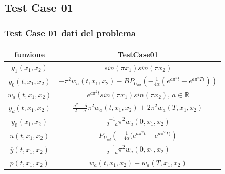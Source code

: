 \documentclass{beamer}
\theoremstyle{definition}
\theoremstyle{remark}
\theoremstyle{plain}
\theoremstyle{definition}
\begin{document}
\subsection{Test Case 01}
\begin{frame}
\frametitle{Test Case 01 dati del problema}
\begin{tabular}{|c|c|}
\hline
\textbf{funzione} & \textbf{TestCase01}\\
\hline
$g_1(x_1,x_2)$ & $sin({\pi}x_1)sin({\pi}x_2)$\\
\hline
$g_0(t,x_1,x_2)$ & $ -{\pi}^2w_a(t,x_1,x_2) - BP_{U_{ad}} \left( -\frac{1}{4\alpha} (e^{a{\pi}^2t} - e^{a{\pi}^2T)}) \right)$ \\
\hline
$w_a(t,x_1,x_2)$ & $e^{a{\pi}^2t}sin({\pi}x_1)sin({\pi}x_2) \text{, } a \in \mathbb{R}$ \\
\hline
$y_d(t,x_1,x_2)$ & $\frac{a^2 - 5}{2 + a}{\pi}^2w_a(t,x_1,x_2) + 2{\pi}^2w_a(T,x_1,x_2)$ \\
\hline
$y_0(x_1,x_2)$ & $\frac{- 1}{2 + a}{\pi}^2w_a(0,x_1,x_2)$ \\
\hline
$\overline{u}(t,x_1,x_2)$ & $P_{U_{ad}} \left( -\frac{1}{4\alpha}(e^{a{\pi}^2t}-e^{a{\pi}^2T)} \right)$ \\
\hline
$\overline{y}(t,x_1,x_2)$ & $\frac{- 1}{2 + a}{\pi}^2w_a(0,x_1,x_2)$ \\
\hline
$\overline{p}(t,x_1,x_2)$ & $w_a(t,x_1,x_2) - w_a(T,x_1,x_2)$ \\
\hline
\end{tabular}

\end{frame}
\end{document}
